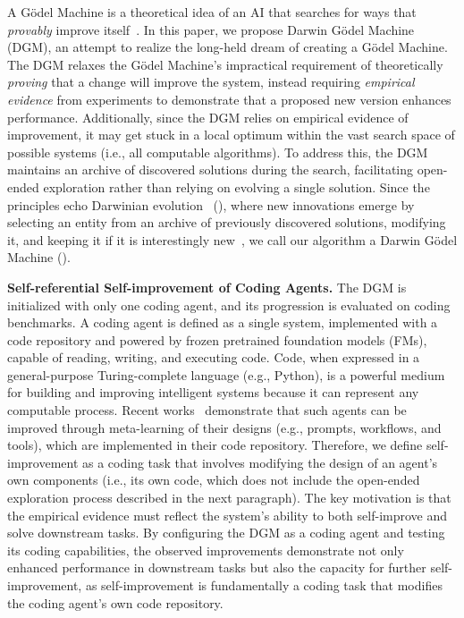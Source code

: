 \documentclass{article} %
\begin{document}
A G\"odel Machine is a theoretical idea of an AI that searches for ways that \emph{provably} improve itself~\citep{schmidhuber2007godel}. In this paper, we propose Darwin G\"odel Machine (DGM), an attempt to realize the long-held dream of creating a G\"odel Machine. The DGM relaxes the G\"odel Machine's impractical requirement of theoretically \emph{proving} that a change will improve the system, instead requiring \emph{empirical evidence} from experiments to demonstrate that a proposed new version enhances performance. Additionally, since the DGM relies on empirical evidence of improvement, it may get stuck in a local optimum within the vast search space of possible systems (i.e., all computable algorithms). To address this, the DGM maintains an archive of discovered solutions during the search, facilitating open-ended exploration rather than relying on evolving a single solution. Since the principles echo Darwinian evolution~\citep{darwin2023origin} (), where new innovations emerge by selecting an entity from an archive of previously discovered solutions, modifying it, and keeping it if it is interestingly new~\citep{zhang2024omni, faldor2025omni, stanley2015greatness}, we call our algorithm a Darwin G\"odel Machine ().

\textbf{Self-referential Self-improvement of Coding Agents.}
The DGM is initialized with only one coding agent, and its progression is evaluated on coding benchmarks. A coding agent is defined as a single system, implemented with a code repository and powered by frozen pretrained foundation models (FMs), capable of reading, writing, and executing code. Code, when expressed in a general-purpose Turing-complete language (e.g., Python), is a powerful medium for building and improving intelligent systems because it can represent any computable process. Recent works~\citep{hu2025automated, zhang2024aflow} demonstrate that such agents can be improved through meta-learning of their designs (e.g., prompts, workflows, and tools), which are implemented in their code repository. Therefore, we define self-improvement as a coding task that involves modifying the design of an agent's own components (i.e., its own code, which does not include the open-ended exploration process described in the next paragraph). The key motivation is that the empirical evidence must reflect the system's ability to both self-improve and solve downstream tasks. By configuring the DGM as a coding agent and testing its coding capabilities, the observed improvements demonstrate not only enhanced performance in downstream tasks but also the capacity for further self-improvement, as self-improvement is fundamentally a coding task that modifies the coding agent's own code repository.
\end{document}
